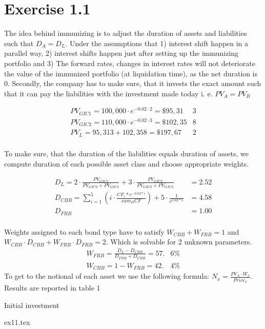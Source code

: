 
\section*{Exercise 1.1}

The idea behind immunizing is to adjust the duration of assets and liabilities such that $D_{A}=D_{L}$. Under the assumptions that 1) interest shift happen in a parallel way, 2) interest shifts happen just after setting up the immunizing portfolio and 3) The forward rates, changes in interest rates will not deteriorate the value of the immunized portfolio (at liquidation time), as the net duration is 0. Secondly, the company has to make sure, that it invests the exact amount such that it can pay the liabilities with the investment made today i. e. $PV_A = PV_B$

\begin{align*}
PV_{GIC1} = 100,000\cdot e^{-0.02\cdot 2} = \$ 95,31&3 \\
PV_{GIC2} = 110,000\cdot e^{-0.02\cdot 3} = \$ 102,35&8 \\
PV_{L} = 95,313 + 102,358 = \$ 197,67&2 \\
\end{align*}

To make sure, that the duration of the liabilities equals duration of assets, we compute duration of each possible asset class and choose appropriate weights.

\begin{align*}
D_{L} = 2\cdot \frac{PV_{GIC1}}{PV_{GIC2}+PV_{GIC2}} + 3\cdot\frac{PV_{GIC2}}{PV_{GIC2}+PV_{GIC2}} &= 2.52 \\
D_{CBB} = \sum_{i=1}^{5}(i\cdot\frac{CF_{i}*e^{-0.02*i}}{sum_DCF})+5\cdot \frac{1}{e^{0.02*5}} &= 4.58 \\
D_{FRB} &= 1.00 \\
\end{align*}

Weights assigned to each bond type have to satisfy $W_{CBB} + W_{FRB} = 1$ and $W_{CBB}\cdot D_{CBB} + W_{FRB}\cdot D_{FRB} = 2$. Which is solvable for 2 unknown parameters.
\begin{align*}
W_{FRB} = \frac{D_{L}-D_{CBB}}{D_{FRB}+D_{CBB}} = 57.&6 \% \\
W_{CBB} = 1 - W_{FRB} = 42.&4 \%
\end{align*}
To get to the notional of each asset we use the following formula: $N_{x} = \frac{PV_{A}\cdot W_{x}}{Price_{x}} $. Results are reported in table 1

\begin{table}[ht]
\centering
\caption{Initial investment}
\label{tab:initial_investment}
{ex11.tex}
\end{table}
